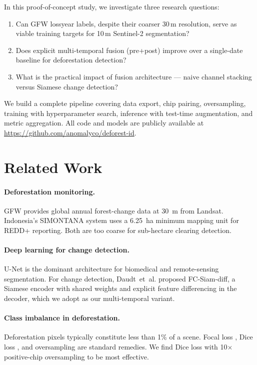 \documentclass[10pt,a4paper,onecolumn]{article}
\begin{document}
In this proof-of-concept study, we investigate three research questions:
\begin{enumerate}[nosep]
    \item Can GFW lossyear labels, despite their coarser 30\,m
          resolution, serve as viable training targets for 10\,m
          Sentinel-2 segmentation?
    \item Does explicit multi-temporal fusion (pre+post) improve
          over a single-date baseline for deforestation detection?
    \item What is the practical impact of fusion architecture ---
          naive channel stacking versus Siamese change detection?
\end{enumerate}

We build a complete pipeline covering data export, chip pairing,
oversampling, training with hyperparameter search, inference with
test-time augmentation, and metric aggregation.  All code and models
are publicly available at \url{https://github.com/anomalyco/deforest-id}.

\section{Related Work}

\paragraph{Deforestation monitoring.}
GFW \cite{hansen2013high} provides global annual forest-change data
at 30~m from Landsat.  Indonesia's SIMONTANA system uses a 6.25~ha
minimum mapping unit for REDD+ reporting.  Both are too coarse for
sub-hectare clearing detection.

\paragraph{Deep learning for change detection.}
U-Net \cite{ronneberger2015unet} is the dominant architecture for
biomedical and remote-sensing segmentation.  For change detection,
Daudt~et~al. \cite{daudt2018fcsiam} proposed FC-Siam-diff, a Siamese
encoder with shared weights and explicit feature differencing in the
decoder, which we adopt as our multi-temporal variant.

\paragraph{Class imbalance in deforestation.}
Deforestation pixels typically constitute less than 1\% of a scene.
Focal loss \cite{lin2017focal}, Dice loss \cite{milletari2016vnet},
and oversampling are standard remedies.  We find Dice loss with
10$\times$ positive-chip oversampling to be most effective.
\end{document}
